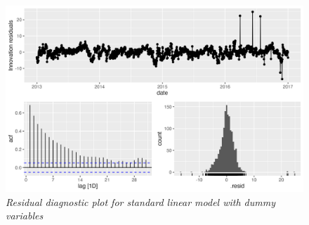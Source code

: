 \begin{figure}[!h]
    \centering
    \includegraphics[width=.8\textwidth]{images/linear_dummy_model_resid_diagnostic.png}
    \caption{\small \textit{Residual diagnostic plot for standard linear model with dummy variables}}
    \label{fig:figure1}
\end{figure}







